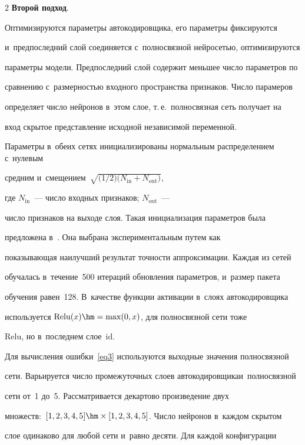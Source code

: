 \begin{multicols}{2}
\textbf{Второй подход}.


Оптимизируются параметры автокодировщика, его параметры фиксируются 


и~предпоследний слой соединяется с~полносвязной нейросетью, оптимизируются 


параметры модели. Предпоследний слой содержит меньшее число параметров по 


сравнению с~размерностью входного пространства признаков. Число парамеров 


определяет число нейронов в~этом слое, т.\,е.\ полносвязная сеть получает на 


вход скрытое представление исходной независимой переменной.





Параметры в~обеих сетях инициализированы нормальным распределением с~нулевым 


средним и~смещением~$\sqrt{({1}/{2)}({N_{\mathrm{in}}+N_{\mathrm{out}})}}$, 


где $N_{\mathrm{in}}$~--- чис\-ло входных признаков; $N_{\mathrm{out}}$~--- 


число признаков на выходе слоя. Такая инициализация параметров была 


предложена в~\cite{fifth}. Она выбрана экспериментальным путем как 


показывающая наилучший результат точности аппроксимации. Каждая из сетей 


обучалась в~течение~500 итераций обновления параметров, и~размер пакета 


обучения равен~128.  В~качестве функции активации в~слоях автокодировщика 


используется $\mathrm{Relu}(x) \hm= \max(0,x)$, для полносвязной сети тоже 


$\mathrm{Relu}$, но в~последнем слое~$\mathrm{id}$.





Для вычисления ошибки~\eqref{eq3} используются выходные значения полносвязной 


сети. Варьируется число промежуточных слоев автокодировщика\linebreak и~полносвязной 


сети от~1 до~5. Рассматривается декартово произведение двух 


множеств:~$[1,2,3,4,5] \hm\times [1,2,3,4,5]$. Число нейронов в~каждом скрытом 


слое одинаково для любой сети и~равно десяти. Для каждой конфигурации 



\end{multicols}
